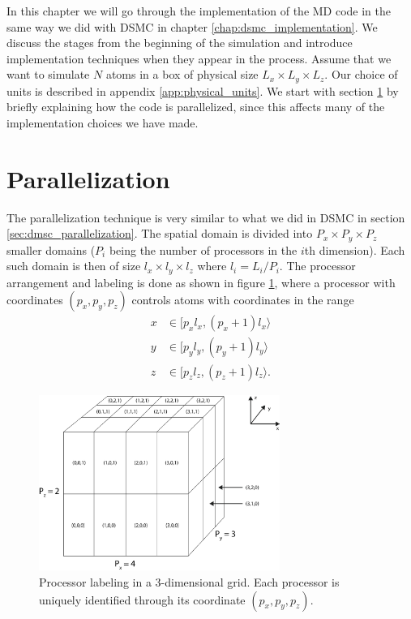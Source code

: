 In this chapter we will go through the implementation of the MD code in the same way we did with DSMC in chapter \ref{chap:dsmc_implementation}. We discuss the stages from the beginning of the simulation and introduce implementation techniques when they appear in the process. Assume that we want to simulate $N$ atoms in a box of physical size $L_x \times L_y \times L_z$. Our choice of units is described in appendix \ref{app:physical_units}. We start with section \ref{sec:md_parallelization} by briefly explaining how the code is parallelized, since this affects many of the implementation choices we have made. 
\section{Parallelization}
\label{sec:md_parallelization}
The parallelization technique is very similar to what we did in DSMC in section \ref{sec:dmsc_parallelization}. The spatial domain is divided into $P_x\times P_y\times P_z$ smaller domains ($P_i$ being the number of processors in the $i$th dimension). Each such domain is then of size $l_x\times l_y \times l_z$ where $l_i = L_i/P_i$. The processor arrangement and labeling is done as shown in figure \ref{fig:md_parallelization_2}, where a processor with coordinates $(p_x, p_y, p_z)$ controls atoms with coordinates in the range
\begin{align}
	\nonumber
	x&\in[p_xl_x, (p_x+1)l_x\rangle\\
	\nonumber
	y&\in[p_yl_y, (p_y+1)l_y\rangle\\
	z&\in[p_zl_z, (p_z+1)l_z\rangle.
\end{align}
\begin{figure}[h!]
\begin{center}
\includegraphics[width=0.7\textwidth, trim=0cm 0cm 0cm 0cm, clip]{DSMC/figures/parallelization_node_configuration.eps}
\end{center}
\caption{Processor labeling in a 3-dimensional grid. Each processor is uniquely identified through its coordinate $(p_x, p_y, p_z)$.}
\label{fig:md_parallelization_2}
\end{figure}
